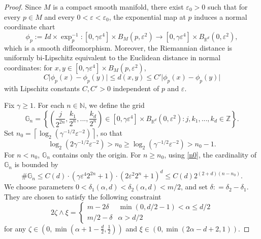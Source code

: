 \documentclass[12pt]{amsart}
\numberwithin{equation}{section}
\newcommand{\R}{\mathbb{R}}
\newcommand{\Z}{\mathbb{Z}}
\newcommand{\N}{\mathbb{N}}
\newcommand{\1}{\mathbf{1}}
\begin{document}
\begin{proof} Since $M$ is a compact smooth manifold, there exist $\varepsilon_0>0$ such that for every $p\in M$ and every $0<\varepsilon<\varepsilon_0$, the exponential map at $p$ induces a normal coordinate chart
\begin{equation*}
    \phi_p:=Id\times\exp_p^{-1}:\left[0,\gamma\varepsilon^4\right]\times B_M(p,\varepsilon^2)\to \left[0,\gamma\varepsilon^4\right]\times B_{\R^d}(0,\varepsilon^2),
\end{equation*}
which is a smooth diffeomorphism. Moreover, the Riemannian distance is uniformly bi-Lipschitz equivalent to the Euclidean distance in normal coordinates: for $x,y\in \left[0,\gamma\varepsilon^4\right]\times B_M(p,\varepsilon^2)$,
\begin{equation}
\label{biLip}
    C\vert\phi_p(x)-\phi_p(y)\vert\leq d(x,y)\leq C'\vert\phi_p(x)-\phi_p(y)\vert
\end{equation}
with Lipschitz constants $C,C'>0$ independent of $p$ and $\varepsilon$.

Fix $\gamma\geq 1$. For each $n\in\N$, we define the grid 
\[\mathbb{G}_n=\left\lbrace\left(\frac{j}{2^{2n}},\frac{k_1}{2^{n}},...,\frac{k_d}{2^{n}}\right)\in \left[0,\gamma\varepsilon^4\right]\times B_{\R^d}(0,\varepsilon^2):j,k_1,...,k_d\in\Z\right\rbrace.\]
Set $n_0=\left\lceil \log_2\left(\gamma^{-1/2}\varepsilon^{-2}\right)\right\rceil$, so that 
\begin{equation}
\label{n0}
\log_2\left(2\gamma^{-1/2}\varepsilon^{-2}\right)>n_0\geq\log_2\left(\gamma^{-1/2}\varepsilon^{-2}\right)>n_0-1.
\end{equation}
For $n< n_0$, $\mathbb{G}_n$ contains only the origin. For $n\geq n_0$, using \eqref{n0}, the cardinality of $\mathbb{G}_n$ is bounded by
\begin{equation*}
\#\mathbb{G}_n\leq C(d)\cdot\left(\gamma\varepsilon^4 2^{2n}+1\right)\cdot\left(2\varepsilon^2 2^n+1\right)^d \leq C(d)2^{(2+d)(n-n_0)}.
\end{equation*}
We choose parameters $0<\delta_1(\alpha,d)<\delta_2(\alpha,d)<m/2$, and set $\delta: = \delta_2-\delta_1$. They are chosen to satisfy the following constraint
\begin{equation}
\label{deltaconstraint}
2\zeta\wedge\xi=\begin{cases}
    m-2\delta & \min(0,d/2-1)<\alpha\leq d/2\\
    m/2-\delta & \alpha>d/2
\end{cases}
\end{equation}
for any $\zeta\in\left(0,\min\left(\alpha+1-\frac{d}{2},\frac{1}{2}\right)\right)$ and $\xi\in(0,\min\left(2\alpha-d+2,1\right))$. 


\end{proof}
\end{document}
